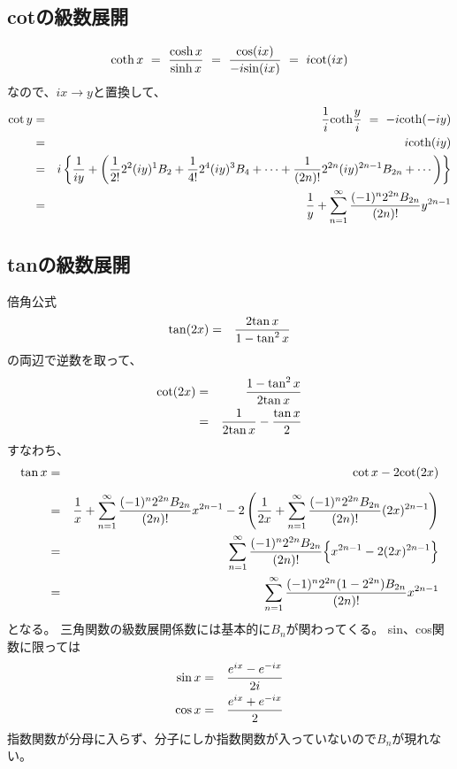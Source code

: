 \documentclass[uplatex,a4j,12pt,dvipdfmx]{jsarticle}
\begin{document}
\subsection{cotの級数展開}
\begin{eqnarray}
	{\rm coth} \ \! x
	\ = \
	\dfrac{{\rm cosh} \ \! x}{{\rm sinh} \ \! x}
	\ = \
	\dfrac{{\rm cos}(ix)}{-i{\rm sin}(ix)}
	\ = \
	i {\rm cot} (ix)
\end{eqnarray}
なので、$ix \to y$と置換して、
\begin{eqnarray}
	{\rm cot} \ \! y
	&=&
	\dfrac{1}{i} {\rm coth} \dfrac{y}{i}
	\ = \
	-i {\rm coth} (-iy)
	\nonumber \\ &=&
	i {\rm coth} (iy)
	\nonumber \\ &=&
	i
	\left\{
	\dfrac{1}{iy}
	+
	\left(
	\dfrac{1}{2!}
	2^{2} (iy)^{1}
	B_{2}
	+
	\dfrac{1}{4!}
	2^{4} (iy)^{3}
	B_{4}
	+
	\cdots
	+
	\dfrac{1}{(2n)!}
	2^{2n} (iy)^{2n-1}
	B_{2n}
	+
	\cdots
	\right)
	\right\}
	\nonumber \\ &=&
	\dfrac{1}{y}
	+
	\sum_{n=1}^{\infty}
	\dfrac{(-1)^{n} 2^{2n} B_{2n} }{(2n)!}
	y^{2n-1}
\end{eqnarray}

\subsection{tanの級数展開}

倍角公式
\begin{eqnarray}
	{\rm tan} (2x)
	&=&
	\dfrac{ 2 {\rm tan} \ \! x }{ 1 - {\rm tan}^{2} \ \! x }
\end{eqnarray}
の両辺で逆数を取って、
\begin{eqnarray}
	{\rm cot} (2x)
	&=&
	\dfrac{ 1 - {\rm tan}^{2} \ \! x }{2 {\rm tan} \ \! x }
	\nonumber \\ &=&
	\dfrac{1}{2 {\rm tan} \ \! x }
	-
	\dfrac{{\rm tan} \ \! x}{2}
\end{eqnarray}
すなわち、
\begin{eqnarray}
	{\rm tan} \ \! x
	&=&
	{ \rm cot } \ \! x
	-
	2 { \rm cot } (2x)
	\nonumber \\[2mm] &=&
	\dfrac{1}{x}
	+
	\sum_{n=1}^{\infty}
	\dfrac{(-1)^{n} 2^{2n} B_{2n} }{(2n)!}
	x^{2n-1}
	-
	2
	\left(
	\dfrac{1}{2x}
	+
	\sum_{n=1}^{\infty}
	\dfrac{(-1)^{n} 2^{2n} B_{2n} }{(2n)!}
		(2x)^{2n-1}
	\right)
	\nonumber \\ &=&
	\sum_{n=1}^{\infty}
	\dfrac{(-1)^{n} 2^{2n} B_{2n} }{(2n)!}
	\Big\{
	x^{2n-1}
	-
	2
	(2x)^{2n-1}
	\Big\}
	\nonumber \\ &=&
	\sum_{n=1}^{\infty}
	\dfrac{(-1)^{n} 2^{2n} ( 1 - 2^{2n} ) B_{2n} }{(2n)!}
	x^{2n-1}
\end{eqnarray}
となる。
三角関数の級数展開係数には基本的に$B_{n}$が関わってくる。
sin、cos関数に限っては
\begin{eqnarray}
	{\rm sin} \ \! x
	&=&
	\dfrac{e^{ix} - e^{-ix}}{2i}
	\\
	{\rm cos} \ \! x
	&=&
	\dfrac{e^{ix} + e^{-ix}}{2}
\end{eqnarray}
指数関数が分母に入らず、分子にしか指数関数が入っていないので$B_{n}$が現れない。
\end{document}
